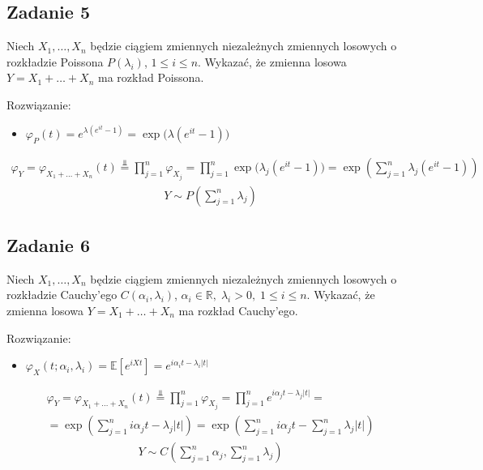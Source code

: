\newpage
\subsection*{Zadanie 5}
Niech $ X_1,\dots,X_n$ będzie ciągiem zmiennych niezależnych zmiennych losowych o rozkładzie Poissona $ P(\lambda_i) $, $ 1\le i\le n $. Wykazać, że zmienna losowa $ Y=X_1+\dots+X_n $ ma rozkład Poissona.

Rozwiązanie:
\begin{itemize}
\item $ \varphi_P(t)=e^{\lambda(e^{it}-1)}=\exp\bigl(\lambda(e^{it}-1)\bigr) $
\end{itemize}
\begin{gather*}
\varphi_{Y}=\varphi_{X_1+\dots+X_n}(t)\stackrel{\Perp}{=}
\prod_{j=1}^{n}\varphi_{X_j}
=
\prod_{j=1}^{n}\exp\bigl(\lambda_j(e^{it}-1)\bigr)
=
\exp\left(\sum_{j=1}^{n}\lambda_j(e^{it}-1)\right)
\end{gather*}
\begin{gather*}
Y\sim P\left(\sum_{j=1}^{n}\lambda_j\right)
\end{gather*}


\subsection*{Zadanie 6}
Niech $ X_1,\dots,X_n$ będzie ciągiem zmiennych niezależnych zmiennych losowych o rozkładzie Cauchy'ego $ C(\alpha_i,\lambda_i) $, $ \alpha_i\in \mathbb R ,\;\lambda_i>0,\;1\le i\le n $. Wykazać, że zmienna losowa $ Y=X_1+\dots+X_n $ ma rozkład Cauchy'ego.

Rozwiązanie:
\begin{itemize}
\item $ \varphi_X(t; \alpha_i,\lambda_i)
=
\mathbb E \left[e^{iXt} \right ]
=
e^{i\alpha_it - \lambda_i |t|} $
\end{itemize}
\begin{gather*}
\varphi_{Y}=\varphi_{X_1+\dots+X_n}(t)\stackrel{\Perp}{=}
\prod_{j=1}^{n}\varphi_{X_j}
=
\prod_{j=1}^{n}e^{i\alpha_jt - \lambda_j |t|}
=\\=
\exp \left({\sum_{j=1}^{n}i\alpha_jt - \lambda_j |t|}\right)
=
\exp \left({\sum_{j=1}^{n}i\alpha_jt - \sum_{j=1}^{n}\lambda_j |t|}\right)
\end{gather*}
\begin{gather*}
Y\sim C\left(\sum_{j=1}^{n}\alpha_j,\sum_{j=1}^{n}\lambda_j\right)
\end{gather*}


